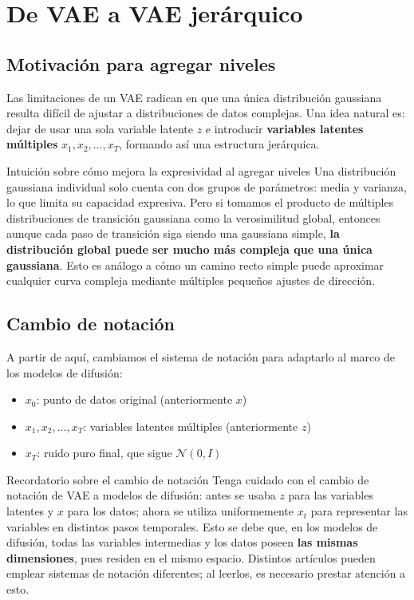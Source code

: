 \section{De VAE a VAE jerárquico}

\subsection{Motivación para agregar niveles}

Las limitaciones de un VAE radican en que una única distribución gaussiana resulta difícil de ajustar a distribuciones de datos complejas. Una idea natural es: dejar de usar una sola variable latente $z$ e introducir \textbf{variables latentes múltiples} $x_1, x_2, \ldots, x_T$, formando así una estructura jerárquica.

\begin{knowledgebox}{Intuición sobre cómo mejora la expresividad al agregar niveles}
Una distribución gaussiana individual solo cuenta con dos grupos de parámetros: media y varianza, lo que limita su capacidad expresiva. Pero si tomamos el producto de múltiples distribuciones de transición gaussiana como la verosimilitud global, entonces aunque cada paso de transición siga siendo una gaussiana simple, \textbf{la distribución global puede ser mucho más compleja que una única gaussiana}. Esto es análogo a cómo un camino recto simple puede aproximar cualquier curva compleja mediante múltiples pequeños ajustes de dirección.
\end{knowledgebox}

\subsection{Cambio de notación}

A partir de aquí, cambiamos el sistema de notación para adaptarlo al marco de los modelos de difusión:

\begin{itemize}
    \item $x_0$: punto de datos original (anteriormente $x$)
    \item $x_1, x_2, \ldots, x_T$: variables latentes múltiples (anteriormente $z$)
    \item $x_T$: ruido puro final, que sigue $\mathcal{N}(0, I)$
\end{itemize}

\begin{warningbox}{Recordatorio sobre el cambio de notación}
Tenga cuidado con el cambio de notación de VAE a modelos de difusión: antes se usaba $z$ para las variables latentes y $x$ para los datos; ahora se utiliza uniformemente $x_t$ para representar las variables en distintos pasos temporales. Esto se debe que, en los modelos de difusión, todas las variables intermedias y los datos poseen \textbf{las mismas dimensiones}, pues residen en el mismo espacio. Distintos artículos pueden emplear sistemas de notación diferentes; al leerlos, es necesario prestar atención a esto.
\end{warningbox}

